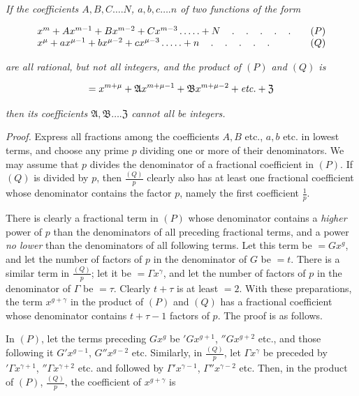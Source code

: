 
\emph{If the coefficients $A,B,C\ldots.N$, $a,b,c\ldots.n$ of two functions of the form}

\[
\begin{array}{l@{\qquad}c}
x^m+Ax^{m-1}+Bx^{m-2}+Cx^{m-3}\mathinner{\ldotp\ldotp\ldotp\ldotp\ldotp}+N
\quad\mathinner{\ldotp\quad\ldotp\quad\ldotp\quad\ldotp\quad\ldotp}&(P)\\
x^\mu+ax^{\mu-1}+bx^{\mu-2}+cx^{\mu-3}\mathinner{\ldotp\ldotp\ldotp\ldotp\ldotp}+n
\quad\mathinner{\ldotp\quad\ldotp\quad\ldotp\quad\ldotp\quad\ldotp}&(Q)
\end{array}
\]

\noindent\emph{are all rational, but not all integers, and the product of $(P)$ and $(Q)$ is}

\[=x^{m+\mu}+\mathfrak{A}x^{m+\mu-1}+\mathfrak{B}x^{m+\mu-2}+\emph{etc.}+\mathfrak{Z}\]

\noindent\emph{then its coefficients $\mathfrak{A},\mathfrak{B}\ldots.\mathfrak{Z}$ cannot all be integers.}

\emph{Proof.} Express all fractions among the coefficients $A,B$ etc., $a,b$ etc. in lowest terms, and choose any prime $p$ dividing one or more of their denominators. We may assume that $p$ divides the denominator of a fractional coefficient in $(P)$. If $(Q)$ is divided by $p$, then $\frac{(Q)}{p}$ clearly also has at least one fractional coefficient whose denominator contains the factor $p$, namely the first coefficient $\frac{1}{p}$.


There is clearly a fractional term in $(P)$ whose denominator contains a \emph{higher} power of $p$ than the denominators of all preceding fractional terms, and a power \emph{no lower} than the denominators of all following terms. Let this term be $=Gx^g$, and let the number of factors of $p$ in the denominator of $G$ be $=t$. There is a similar term in $\frac{(Q)}{p}$; let it be $=\varGamma x^\gamma$, and let the number of factors of $p$ in the denominator of $\varGamma$ be $=\tau$. Clearly $t+\tau$ is at least $=2$. With these preparations, the term $x^{g+\gamma}$ in the product of $(P)$ and $(Q)$ has a fractional coefficient whose denominator contains $t+\tau-1$ factors of $p$. The proof is as follows.

In $(P)$, let the terms preceding $Gx^g$ be ${}'Gx^{g+1}$, ${}''Gx^{g+2}$ etc., and those following it $G'x^{g-1}$, $G''x^{g-2}$ etc. Similarly, in $\frac{(Q)}{p}$, let $\varGamma x^\gamma$ be preceded by ${}'\varGamma x^{\gamma+1}$, ${}''\varGamma x^{\gamma+2}$ etc. and followed by $\varGamma'x^{\gamma-1}$, $\varGamma''x^{\gamma-2}$ etc. Then, in the product of $(P)$, $\frac{(Q)}{p}$, the coefficient of $x^{g+\gamma}$ is

